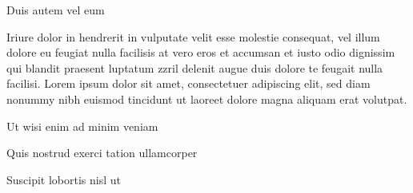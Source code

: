 \documentclass[11pt,twoside]{article}\makeatletter
\begin{document}
Duis autem vel eum \par
Iriure dolor in hendrerit in vulputate velit esse molestie       consequat, vel illum dolore eu feugiat nulla facilisis at vero eros et       accumsan et iusto odio dignissim qui blandit praesent luptatum zzril       delenit augue duis dolore te feugait nulla facilisi. Lorem ipsum dolor       sit amet, consectetuer adipiscing elit, sed diam nonummy nibh euismod       tincidunt ut laoreet dolore magna aliquam erat volutpat. \par
Ut wisi enim ad minim veniam\par
Quis nostrud exerci tation ullamcorper \par
Suscipit lobortis nisl ut 
\end{document}
